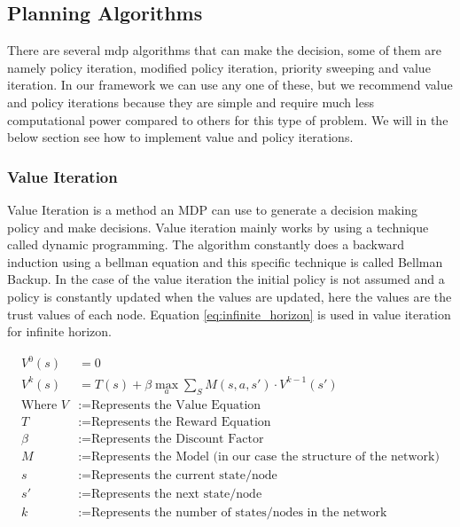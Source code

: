 \subsection{Planning Algorithms}
\label{sec:planning}
There are several \gls{mdp} algorithms that can make the decision, some of them are
namely policy iteration, modified policy iteration, priority sweeping and value
iteration.  In our framework we can use any one of these, but we recommend value
and policy iterations because they are simple and require much less
computational power compared to others for this type of problem. We will in the
below section see how to implement value and policy iterations.


\subsubsection{Value Iteration}
Value Iteration is a method an MDP can use to generate a decision making policy and make decisions. 
Value iteration mainly works by using a technique called dynamic
programming. The algorithm constantly does a backward induction using a bellman
equation \autocite{Wikipedia2013} and this specific technique is called Bellman Backup. In the case of the
value iteration the initial policy is not assumed and a policy is constantly
updated when the values are updated, here the values are the trust
values of each node.  Equation \ref{eq:infinite_horizon} is used in value iteration for infinite
horizon.

\begin{equation} 
    \label{eq:infinite_horizon}
    \begin{aligned}
    V^0(s) &= 0 \\
    V^k(s) &= T(s) + \beta \max_a \sum_S M(s,a,s') \cdot V^{k-1}(s') \\
    \text{Where } V &:= \text{Represents the Value Equation} \\
    T &:= \text{Represents the Reward Equation} \\
    \beta &:= \text{Represents the Discount Factor} \\
    M &:= \text{Represents the Model (in our case the structure of the network)} \\
    s &:= \text{Represents the current state/node} \\
    s' &:= \text{Represents the next state/node} \\
    k &:= \text{Represents the number of states/nodes in the network}
    \end{aligned}
\end{equation}


